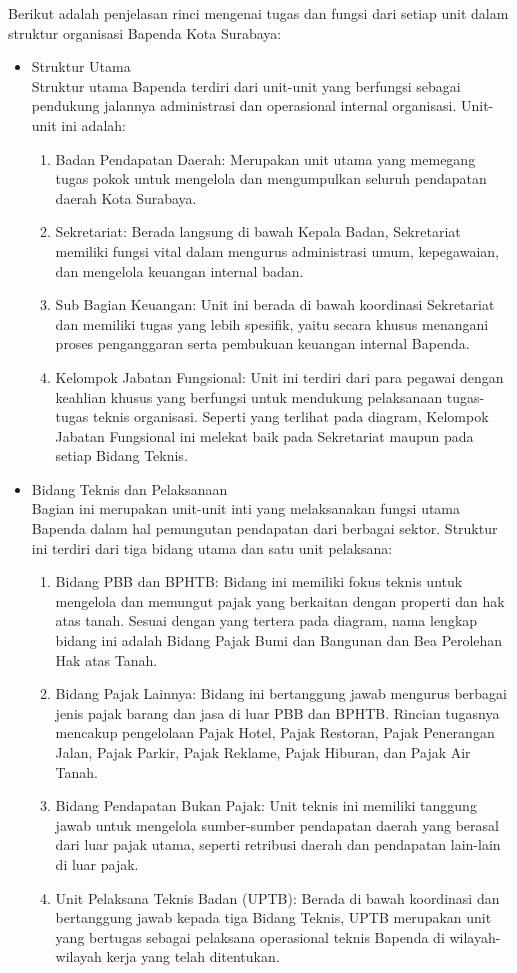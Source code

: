 Berikut adalah penjelasan rinci mengenai tugas dan fungsi dari setiap unit dalam struktur organisasi Bapenda Kota Surabaya:
\begin{itemize}
    \item Struktur Utama \\
    Struktur utama Bapenda terdiri dari unit-unit yang berfungsi sebagai pendukung jalannya administrasi dan operasional internal organisasi. Unit-unit ini adalah:
    \begin{enumerate}
        \item Badan Pendapatan Daerah: Merupakan unit utama yang memegang tugas pokok untuk mengelola dan mengumpulkan seluruh pendapatan daerah Kota Surabaya.
        \item Sekretariat: Berada langsung di bawah Kepala Badan, Sekretariat memiliki fungsi vital dalam mengurus administrasi umum, kepegawaian, dan mengelola keuangan internal badan.
        \item Sub Bagian Keuangan: Unit ini berada di bawah koordinasi Sekretariat dan memiliki tugas yang lebih spesifik, yaitu secara khusus menangani proses penganggaran serta pembukuan keuangan internal Bapenda.
        \item Kelompok Jabatan Fungsional: Unit ini terdiri dari para pegawai dengan keahlian khusus yang berfungsi untuk mendukung pelaksanaan tugas-tugas teknis organisasi. Seperti yang terlihat pada diagram, Kelompok Jabatan Fungsional ini melekat baik pada Sekretariat maupun pada setiap Bidang Teknis.
    \end{enumerate}
    \item Bidang Teknis dan Pelaksanaan \\
    Bagian ini merupakan unit-unit inti yang melaksanakan fungsi utama Bapenda dalam hal pemungutan pendapatan dari berbagai sektor. Struktur ini terdiri dari tiga bidang utama dan satu unit pelaksana:
    \begin{enumerate}
        \item Bidang PBB dan BPHTB: Bidang ini memiliki fokus teknis untuk mengelola dan memungut pajak yang berkaitan dengan properti dan hak atas tanah. Sesuai dengan yang tertera pada diagram, nama lengkap bidang ini adalah Bidang Pajak Bumi dan Bangunan dan Bea Perolehan Hak atas Tanah.
        \item Bidang Pajak Lainnya: Bidang ini bertanggung jawab mengurus berbagai jenis pajak barang dan jasa di luar PBB dan BPHTB. Rincian tugasnya mencakup pengelolaan Pajak Hotel, Pajak Restoran, Pajak Penerangan Jalan, Pajak Parkir, Pajak Reklame, Pajak Hiburan, dan Pajak Air Tanah.
        \item Bidang Pendapatan Bukan Pajak: Unit teknis ini memiliki tanggung jawab untuk mengelola sumber-sumber pendapatan daerah yang berasal dari luar pajak utama, seperti retribusi daerah dan pendapatan lain-lain di luar pajak.
        \item Unit Pelaksana Teknis Badan (UPTB): Berada di bawah koordinasi dan bertanggung jawab kepada tiga Bidang Teknis, UPTB merupakan unit yang bertugas sebagai pelaksana operasional teknis Bapenda di wilayah-wilayah kerja yang telah ditentukan.
    \end{enumerate}
\end{itemize}